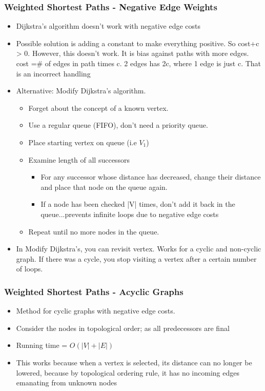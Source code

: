 \documentclass[10pt]{article}
\begin{document}
\subsubsection{Weighted Shortest Paths - Negative Edge Weights}
\begin{itemize}
    \item Dijkstra’s algorithm doesn’t work with negative edge costs
    \item Possible solution is adding a constant to make everything positive. So cost+c > 0. However, this doesn't work. It is bias against paths with more edges. cost =\# of edges in path times c. 2 edges has 2c, where 1 edge is just c. That is an incorrect handling
    \item Alternative: Modify Dijkstra's algorithm.
          \begin{itemize}
              \item Forget about the concept of a known vertex.
              \item Use a regular queue (FIFO), don't need a priority queue.
              \item Place starting vertex on queue (i.e $V_1$)
              \item Examine length of all successors
                    \begin{itemize}
                        \item For any successor whose distance has decreased, change their distance and place that node on the queue again.
                        \item If a node has been checked |V| times, don’t
                              add it back in the queue...prevents infinite
                              loops due to negative edge costs
                    \end{itemize}
              \item Repeat until no more nodes in the queue.
          \end{itemize}
    \item In Modify Dijkstra's, you can revisit vertex. Works for a cyclic and non-cyclic graph. If there was a cycle, you stop visiting a vertex after a certain number of loops.
\end{itemize}
\subsubsection{Weighted Shortest Paths - Acyclic Graphs}
\begin{itemize}
    \item Method for cyclic graphs with negative edge costs.
    \item Consider the nodes in topological order; as all predecessors are final
    \item Running time = $O(|V| + |E|)$
    \item This works because when a vertex is selected, its distance can no longer be lowered, because by topological ordering rule, it has no incoming edges emanating from unknown nodes
\end{itemize}
\end{document}
